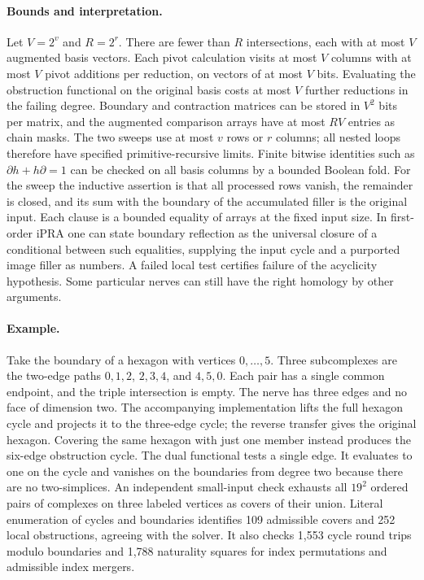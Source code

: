 \paragraph{Bounds and interpretation.}
Let $V=2^v$ and $R=2^r$. There are fewer than $R$ intersections, each
with at most $V$ augmented basis vectors. Each pivot calculation visits
at most $V$ columns with at most $V$ pivot additions per reduction, on
vectors of at most $V$ bits. Evaluating the obstruction functional on
the original basis costs at most $V$ further reductions in the failing
degree. Boundary and contraction matrices can be stored in $V^2$ bits
per matrix, and the augmented comparison arrays have at most $RV$ entries
as chain masks. The two sweeps use at most $v$ rows or $r$ columns;
all nested loops therefore have specified primitive-recursive limits.
Finite bitwise identities such as $\partial h+h\partial=1$ can be checked
on all basis columns by a bounded Boolean fold. For the sweep the
inductive assertion is that all processed rows vanish, the remainder is
closed, and its sum with the boundary of the accumulated filler is the
original input. Each clause is a bounded equality of arrays at the fixed
input size. In first-order iPRA one can state boundary reflection as the
universal closure of a conditional between such equalities, supplying the
input cycle and a purported image filler as numbers. A failed local test
certifies failure of the acyclicity hypothesis. Some particular nerves
can still have the right homology by other arguments.

\paragraph{Example.}
Take the boundary of a hexagon with vertices $0,\ldots,5$. Three subcomplexes
are the two-edge paths $0,1,2$, $2,3,4$, and $4,5,0$. Each pair has a
single common endpoint, and the triple intersection is empty. The nerve
has three edges and no face of dimension two. The accompanying implementation
lifts the full hexagon cycle and projects it to the three-edge cycle;
the reverse transfer gives the original hexagon. Covering the same hexagon
with just one member instead produces the six-edge obstruction cycle.
The dual functional tests a single edge. It evaluates to one on the
cycle and vanishes on the boundaries from degree two because there are no
two-simplices. An independent small-input check exhausts all $19^2$
ordered pairs of complexes on three labeled vertices as covers of their
union. Literal enumeration of cycles and boundaries identifies 109
admissible covers and 252 local obstructions, agreeing with the solver.
It also checks 1,553 cycle round trips modulo boundaries and 1,788
naturality squares for index permutations and admissible index mergers.


